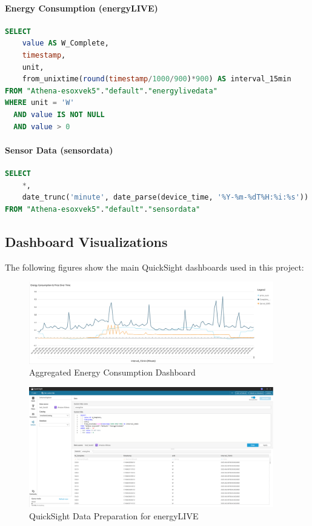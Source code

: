 \paragraph{Energy Consumption (energyLIVE)}
\begin{lstlisting}[language=SQL]
SELECT
    value AS W_Complete,
    timestamp,
    unit,
    from_unixtime(round(timestamp/1000/900)*900) AS interval_15min
FROM "Athena-esoxvek5"."default"."energylivedata"
WHERE unit = 'W'
  AND value IS NOT NULL
  AND value > 0
\end{lstlisting}

\paragraph{Sensor Data (sensordata)}
\begin{lstlisting}[language=SQL]
SELECT
    *,
    date_trunc('minute', date_parse(device_time, '%Y-%m-%dT%H:%i:%s')) as interval_15min
FROM "Athena-esoxvek5"."default"."sensordata"
\end{lstlisting}

\subsection{Dashboard Visualizations}
The following figures show the main QuickSight dashboards used in this project:

\begin{figure}[H]
    \centering
    \includegraphics[width=0.95\textwidth]{fig/aggregated_Energyconsumption Dashboard.png}
    \caption{Aggregated Energy Consumption Dashboard}
\end{figure}

\begin{figure}[H]
    \centering
    \includegraphics[width=0.95\textwidth]{fig/energylive_Data Prep.png}
    \caption{QuickSight Data Preparation for energyLIVE}
\end{figure}

